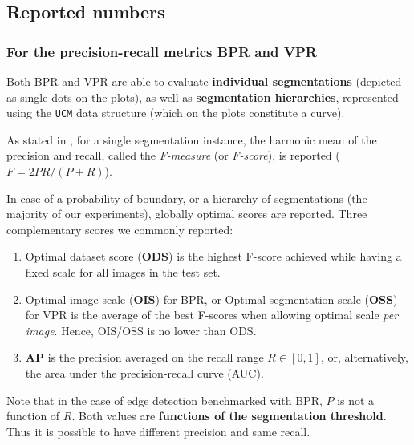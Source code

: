 \subsection{Reported numbers}
\subsubsection*{For the precision-recall metrics BPR and VPR}
Both BPR and VPR are able to evaluate {\bf individual segmentations} (depicted as single dots on the plots), %
as well as {\bf segmentation hierarchies}, represented using the {\tt UCM} data structure (which on the plots constitute a curve). 

As stated in , for a single segmentation instance, the harmonic mean of the precision and recall, called the {\it F-measure} (or {\it F-score}), is 
reported ($F=2PR/(P+R)$).

In case of a probability of boundary, or a hierarchy of segmentations (the majority of our experiments), globally optimal scores %
are reported. %
Three complementary scores we commonly reported:

\begin{enumerate}
 \item Optimal dataset score ({\bf ODS}) is the highest F-score achieved while having a fixed scale for all images in the test set. 
 \item Optimal image scale ({\bf OIS}) for BPR, or Optimal segmentation scale (\textbf{OSS}) for VPR is the average of the best F-scores when allowing optimal scale {\it per image}. Hence, OIS\slash OSS is no lower than ODS. 
 \item {\bf AP} is the precision averaged on the recall range $R\in[0,1]$, or, alternatively, the area under the precision-recall curve (AUC).
\end{enumerate}

Note that in the case of edge detection benchmarked with BPR, $P$ is not a function of $R$. Both values are {\bf functions of the segmentation threshold}. Thus it is possible to have different precision and same recall. %


